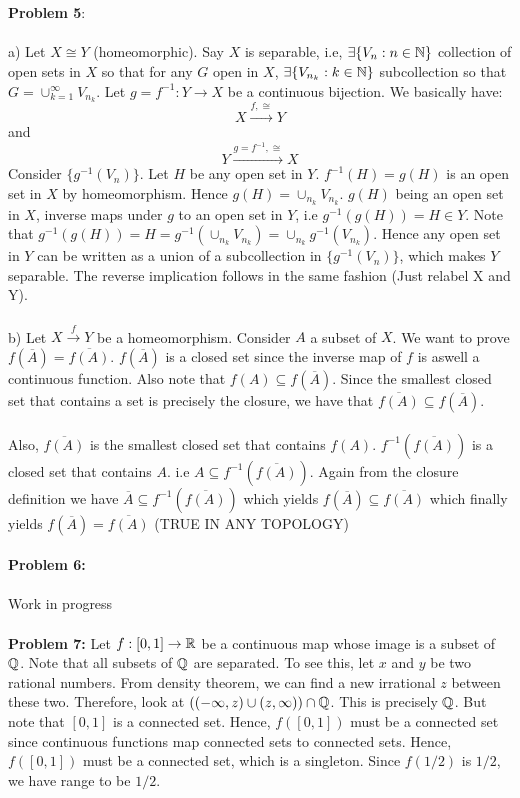 \documentclass[../Main.tex]{subfiles}
\begin{document}
\\\\ \textbf{Problem 5}:
\\\\a) Let $X \cong Y$ (homeomorphic). Say $X$ is separable, i.e, $\exists \{V_n: n \in \mathbb N\}$ collection of open sets in $X$ so that for any $G$ open in $X$, $\exists \{V_{n_k}: k \in \mathbb N\}$ subcollection so that $G=\cup_{k=1}^{\infty} V_{n_k}$. Let $g=f^{-1}:Y \to X$ be a continuous bijection. We basically have: $$X\overset{f, \cong} \rightarrow Y $$ and $$Y \overset{g=f^{-1},\cong}\rightarrow X $$ Consider $\{g^{-1}(V_n)\}$. Let $H$ be any open set in $Y$. $f^{-1}(H)=g(H)$ is an open set in $X$ by homeomorphism. Hence $g(H)=\cup_{n_k}V_{n_k}$. $g(H)$ being an open set in $X$, inverse maps under $g$ to an open set in $Y$, i.e $g^{-1}(g(H))=H \in Y$. Note that $g^{-1}(g(H))=H=g^{-1}(\cup_{n_k}V_{n_k})=\cup_{n_k}g^{-1}(V_{n_k})$. Hence any open set in $Y$ can be written as a union of a subcollection in $\{g^{-1}(V_{n})\}$, which makes $Y$ separable. The reverse implication follows in the same fashion (Just relabel X and Y).
\\\\b) Let $X \overset{f}\rightarrow Y $ be a homeomorphism. Consider $A$ a subset of $X$. We want to prove $f(\overline{A})=\overline{f(A)}$. $f(\overline{A})$ is a closed set since the inverse map of $f$ is aswell a continuous function. Also note that $f(A) \subseteq f(\overline{A})$. Since the smallest closed set that contains a set is precisely the closure, we have that $\overline{f(A)}\subseteq f(\overline{A})$.
\\\\ Also, $\overline{f(A)}$ is the smallest closed set that contains $f(A)$. $f^{-1}(\overline{f(A)})$ is a closed set that contains $A$. i.e $A \subseteq f^{-1}(\overline{f(A)})$. Again from the closure definition we have $\overline{A} \subseteq f^{-1}(\overline{f(A)})$ which yields $f(\overline{A})\subseteq \overline{f(A)}$ which finally yields $f(\overline{A})=\overline{f(A)}$
(TRUE IN ANY TOPOLOGY)
\\\\ \textbf{Problem 6:}
\\\\Work in progress
\\\\ \textbf{Problem 7:}
Let $f: [0,1]\to \mathbb R $ be a continuous map whose image is a subset of $\mathbb Q$. Note that all subsets of $\mathbb Q$ are separated. To see this, let $x$ and $y$ be two rational numbers. From density theorem, we can find a new irrational $z$ between these two. Therefore, look at $((-\infty,z) \cup (z,\infty))\cap \mathbb Q$. This is precisely $\mathbb Q$. But note that $[0,1]$ is a connected set. Hence, $f([0,1])$ must be a connected set since continuous functions map connected sets to connected sets. Hence, $f([0,1])$ must be a connected set, which is a singleton. Since $f(1/2)$ is $1/2$, we have range to be $1/2$.
\end{document}
